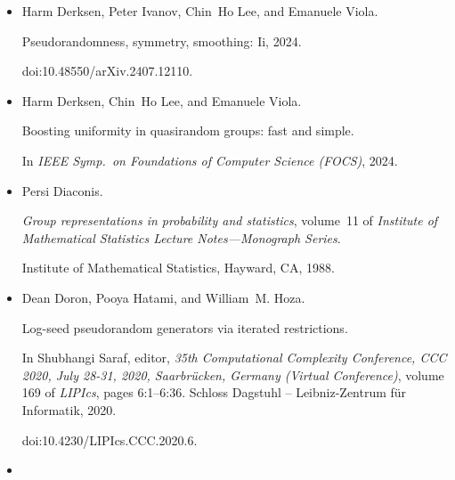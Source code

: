\documentclass[10pt,a4paper]{article}
\begin{document}
\begin{itemize}
Group-theoretic algorithms for matrix multiplication.


In \emph{IEEE Symp. on Foundations of Computer Science (FOCS)}, pages
379–388, 2005.


doi:10.1109/SFCS.2005.39.





\item[] 
[11]

Harm Derksen, Peter Ivanov, Chin Ho Lee, and Emanuele Viola.


Pseudorandomness, symmetry, smoothing: Ii, 2024.


doi:10.48550/arXiv.2407.12110.





\item[] 
[12]

Harm Derksen, Chin Ho Lee, and Emanuele Viola.


Boosting uniformity in quasirandom groups: fast and simple.


In \emph{IEEE Symp. on Foundations of Computer Science (FOCS)}, 2024.





\item[] 
[13]

Persi Diaconis.


\emph{Group representations in probability and statistics}, volume 11
of \emph{Institute of Mathematical Statistics Lecture Notes—Monograph
Series}.


Institute of Mathematical Statistics, Hayward, CA, 1988.





\item[] 
[14]

Dean Doron, Pooya Hatami, and William M. Hoza.


Log-seed pseudorandom generators via iterated restrictions.


In Shubhangi Saraf, editor, \emph{35th Computational Complexity
Conference, CCC 2020, July 28-31, 2020, Saarbrücken, Germany (Virtual
Conference)}, volume 169 of \emph{LIPIcs}, pages 6:1–6:36. Schloss Dagstuhl
– Leibniz-Zentrum für Informatik, 2020.


doi:10.4230/LIPIcs.CCC.2020.6.





\item[] 
[15]


\end{itemize}
\end{document}
